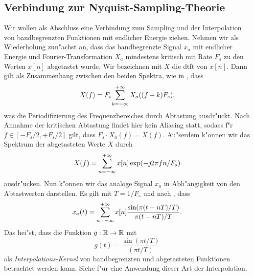 \subsection{Verbindung zur Nyquist-Sampling-Theorie}
%
%
Wir wollen als Abschluss eine Verbindung zum Sampling und der Interpolation~\cite[Kapitel~6.1]{proakis2013} von bandbegrenzten Funktionen mit endlicher Energie ziehen. 
Nehmen wir als Wiederholung zun"achst an, dass das bandbegrenzte Signal $x_a$ mit endlicher Energie und Fourier-Transformation $X_a$ mindestens kritisch mit Rate $F_s$ zu den Werten $x[n]$ abgetastet wurde. 
Wir bezeichnen mit $X$ die \gls{dtft} von $x[n]$. Dann gilt als Zusammenhang zwischen den beiden Spektra, wie in , dass
\begin{equation}
    X(f) = F_s {\sum\limits_{k=-\infty}^{+\infty}{
        X_a((f - k) F_s)
    }},
\end{equation}
was die Periodifizierung des Frequenzbereiches durch Abtastung ausdr"uckt. 
Nach Annahme der kritischen Abtastung findet hier kein Aliasing statt, sodass f\u"r $f \in [-F_s/2,+F_s/2]$ gilt, dass $F_s \cdot X_a(f) = X(f)$. 
Au"serdem k"onnen wir das Spektrum der abgetasteten Werte $X$ durch
\begin{equation}
    X(f) = {\sum\limits_{n=-\infty}^{+\infty}{x[n] \exp(- \jmath 2 \pi f n / F_s)}}
\end{equation}
ausdr"ucken. 
Nun k"onnen wir das analoge Signal $x_a$ in Abh"angigkeit von den Abtastwerten darstellen. 
Es gilt mit $T = 1/F_s$ und nach , dass
\begin{align*}
    x_a(t) = {\sum\limits_{n=-\infty}^{+\infty}{
        x[n] \frac{\sin(\pi(t-nT)/T)}{\pi(t-nT)/T}
    }}.
\end{align*}
Das hei"st, dass die Funktion $g: \mathbb{R} \rightarrow \mathbb{R}$ mit
\begin{equation}\label{eq:bsplines:sinckernel}
    g(t) = \frac{\sin(\pi t / T)}{(\pi t/T)}
\end{equation}
als \emph{Interpolations-Kernel} von bandbegrenzten und abgetasteten Funktionen betrachtet werden kann. 
Siehe  f"ur eine Anwendung dieser Art der Interpolation.

